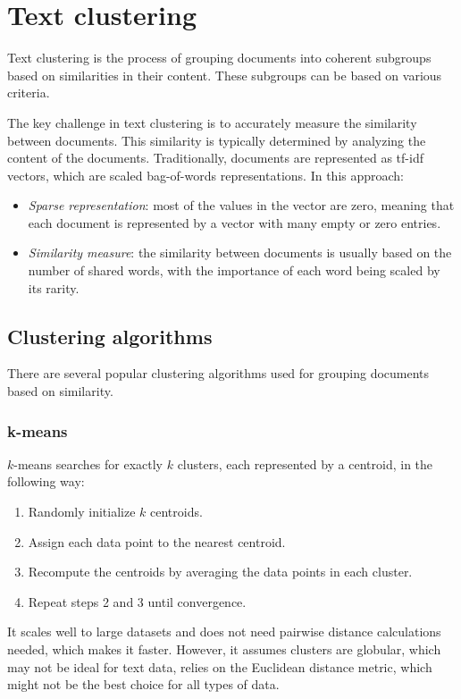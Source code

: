 \section{Text clustering}

Text clustering is the process of grouping documents into coherent subgroups based on similarities in their content. 
These subgroups can be based on various criteria.

The key challenge in text clustering is to accurately measure the similarity between documents. 
This similarity is typically determined by analyzing the content of the documents.
Traditionally, documents are represented as tf-idf vectors, which are scaled bag-of-words representations.
In this approach:
\begin{itemize}
    \item \textit{Sparse representation}: most of the values in the vector are zero, meaning that each document is represented by a vector with many empty or zero entries.
    \item \textit{Similarity measure}: the similarity between documents is usually based on the number of shared words, with the importance of each word being scaled by its rarity.
\end{itemize}

\subsection{Clustering algorithms}
There are several popular clustering algorithms used for grouping documents based on similarity.

\subsubsection{k-means}
$k$-means searches for exactly $k$ clusters, each represented by a centroid, in the following way: 
\begin{enumerate}
    \item Randomly initialize $k$ centroids.
    \item Assign each data point to the nearest centroid.
    \item Recompute the centroids by averaging the data points in each cluster.
    \item Repeat steps 2 and 3 until convergence.
\end{enumerate}
\noindent It scales well to large datasets and does not need pairwise distance calculations needed, which makes it faster.
However, it assumes clusters are globular, which may not be ideal for text data, relies on the Euclidean distance metric, which might not be the best choice for all types of data.


